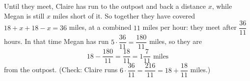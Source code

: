 Until they meet, Claire has run to the outpost and back a distance $x$, while Megan is still $x$ miles short of it. So together they have covered $18+x+18-x=36$ miles, at a combined $11$ miles per hour: they meet after $\dfrac{36}{11}$ hours. In that time Megan has run $5\cdot\dfrac{36}{11}=\dfrac{180}{11}$ miles, so they are
\[
18-\dfrac{180}{11}=\dfrac{18}{11}=\boxed{1\dfrac{7}{11}\text{ miles}}
\]
from the outpost. (Check: Claire runs $6\cdot\dfrac{36}{11}=\dfrac{216}{11}=18+\dfrac{18}{11}$ miles.)

